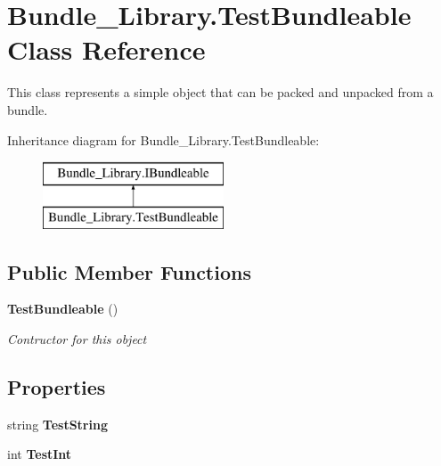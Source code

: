 \section{Bundle\+\_\+\+Library.\+Test\+Bundleable Class Reference}
\label{class_bundle___library_1_1_test_bundleable}


This class represents a simple object that can be packed and unpacked from a bundle.  


Inheritance diagram for Bundle\+\_\+\+Library.\+Test\+Bundleable\+:\begin{figure}[H]
\begin{center}
\leavevmode
\includegraphics[height=2.000000cm]{class_bundle___library_1_1_test_bundleable}
\end{center}
\end{figure}
\subsection*{Public Member Functions}
\begin{DoxyCompactItemize}
\item 
{\bf Test\+Bundleable} ()
\begin{DoxyCompactList}\small\item\em Contructor for this object \end{DoxyCompactList}\end{DoxyCompactItemize}
\subsection*{Properties}
\begin{DoxyCompactItemize}
\item 
string {\bfseries Test\+String}\hspace{0.3cm}{\ttfamily  [get, set]}\label{class_bundle___library_1_1_test_bundleable_a70e5ac66f3a95dc108ab1cf510bbc5ae}

\item 
int {\bfseries Test\+Int}\hspace{0.3cm}{\ttfamily  [get, set]}\label{class_bundle___library_1_1_test_bundleable_ac9c62b50e4b1d8358addb26d3a007b0c}

\end{DoxyCompactItemize}


